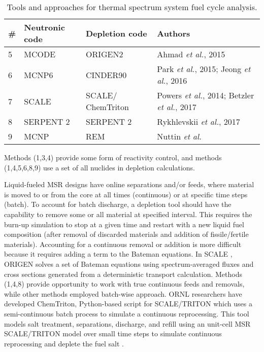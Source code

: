 \begin{table}[h!]
\centering
\caption{Tools and approaches for thermal spectrum system fuel cycle analysis.}
\begin{tabular}{ |m{}|m{}|m{}|m{}|} 
\hline
\# & Neutronic code  & Depletion code    & Authors         \\[5pt]
\hline
5 & MCODE \cite{xu_mcode_2008}      & ORIGEN2 \cite{croff_users_1980}      & Ahmad \emph{et al.}, 2015 \cite{ahmad_neutronics_2015}     \\[5pt]
\hline
6 & \gls{MCNP}6     & CINDER90 \cite{goorley_mcnp6_2013}     & Park \emph{et al.}, 2015; Jeong \emph{et al.}, 2016 \cite{park_whole_2015, jeong_equilibrium_2016}\\[5pt]
\hline
7 & SCALE \cite{bowman_scale_2011}      & SCALE/ ChemTriton \cite{powers_new_2013}    & Powers \emph{et al.}, 2014; Betzler \emph{et al.}, 2017 \cite{powers_new_2013,powers_inventory_2014,betzler_molten_2017}\\[5pt]
\hline
8 & SERPENT 2      & SERPENT 2     & Rykhlevskii \emph{et al.}, 2017 \cite{rykhlevskii_online_2017} \\[5pt]
\hline
9 & \gls{MCNP}      & REM  & Nuttin \emph{et al.} \cite{nuttin_potential_2005}    \\[5pt]
\hline
\end{tabular}
  \label{tab:th_codes}
\end{table}

Methods (1,3,4) provide some form of reactivity control, and methods (1,4,5,6,8,9) use a set of all nuclides in depletion calculations. 

Liquid-fueled \gls{MSR} designs have online separations and/or feeds, where material is moved to or from the core at all times (continuous) or at specific time steps (batch). To account for batch discharge, a depletion tool should have the capability to remove some or all material at specified interval. This requires the burn-up simulation to stop at a given time and restart with a new liquid fuel composition (after removal of discarded materials and addition of fissile/fertile materials). Accounting for a continuous removal or addition is more difficult because it requires adding a term to the Bateman equations. In SCALE \cite{bowman_scale_2011}, ORIGEN \cite{gauld_isotopic_2011} solves a set of Bateman equations using spectrum-averaged fluxes and cross sections generated from a deterministic transport calculation. Methods (1,4,8) provide opportunity to work with true continuous feeds and removals, while other methods employed batch-wise approach. \gls{ORNL} researchers have developed ChemTriton, Python-based script for SCALE/TRITON which uses a semi-continuous batch process to simulate a continuous reprocessing. This tool models salt treatment, separations, discharge, and refill using an unit-cell \gls{MSR} SCALE/TRITON model over small time steps to simulate continuous reprocessing and deplete the fuel salt \cite{powers_new_2013}.

